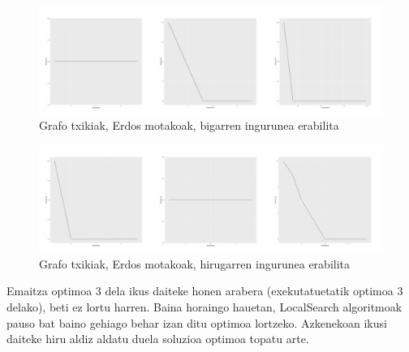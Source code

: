 \documentclass[eu,gi]{ifirak}\usepackage[]{graphicx}\usepackage[]{color}
\makeatletter
\def\maxwidth{ %
  \ifdim\Gin@nat@width>\linewidth
    \linewidth
  \else
    \Gin@nat@width
  \fi
}
\newenvironment{knitrout}{}{} %
\makeatother
\begin{document}
\begin{center}	
\begin{knitrout}
\color{fgcolor}\begin{figure}[!h]
\includegraphics[width=\maxwidth]{figure/unnamed-chunk-5-1} \caption[Grafo txikiak, Erdos motakoak, bigarren ingurunea erabilita]{Grafo txikiak, Erdos motakoak, bigarren ingurunea erabilita}\label{fig:unnamed-chunk-5}
\end{figure}


\end{knitrout}
\end{center}

\begin{center}	
\begin{knitrout}
\color{fgcolor}\begin{figure}[!h]
\includegraphics[width=\maxwidth]{figure/unnamed-chunk-6-1} \caption[Grafo txikiak, Erdos motakoak, hirugarren ingurunea erabilita]{Grafo txikiak, Erdos motakoak, hirugarren ingurunea erabilita}\label{fig:unnamed-chunk-6}
\end{figure}


\end{knitrout}
\end{center}
\pagebreak
Emaitza optimoa 3 dela ikus daiteke honen arabera (exekutatuetatik optimoa 3 delako), beti ez lortu harren. Baina horaingo hauetan, LocalSearch algoritmoak pauso bat baino gehiago behar izan ditu optimoa lortzeko. Azkenekoan ikusi daiteke hiru aldiz aldatu duela soluzioa optimoa topatu arte.\\
\end{document}
